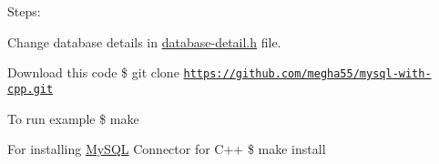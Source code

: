 Steps\-:


\begin{DoxyEnumerate}
\item Change database details in \hyperlink{database-detail_8h}{database-\/detail.\-h} file.
\end{DoxyEnumerate}


\begin{DoxyEnumerate}
\item Download this code \$ git clone \href{https://github.com/megha55/mysql-with-cpp.git}{\tt https\-://github.\-com/megha55/mysql-\/with-\/cpp.\-git}
\end{DoxyEnumerate}


\begin{DoxyEnumerate}
\item To run example \$ make
\end{DoxyEnumerate}


\begin{DoxyEnumerate}
\item For installing \hyperlink{classMySQL}{My\-S\-Q\-L} Connector for C++ \$ make install 
\end{DoxyEnumerate}